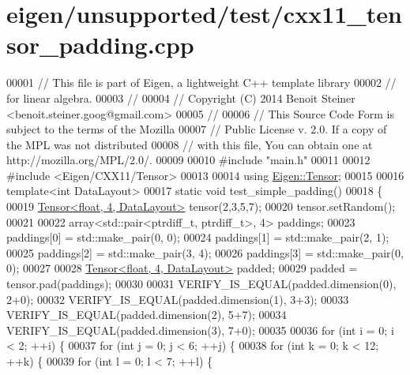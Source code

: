 \hypertarget{eigen_2unsupported_2test_2cxx11__tensor__padding_8cpp_source}{}\section{eigen/unsupported/test/cxx11\+\_\+tensor\+\_\+padding.cpp}
\label{eigen_2unsupported_2test_2cxx11__tensor__padding_8cpp_source}

\begin{DoxyCode}
00001 \textcolor{comment}{// This file is part of Eigen, a lightweight C++ template library}
00002 \textcolor{comment}{// for linear algebra.}
00003 \textcolor{comment}{//}
00004 \textcolor{comment}{// Copyright (C) 2014 Benoit Steiner <benoit.steiner.goog@gmail.com>}
00005 \textcolor{comment}{//}
00006 \textcolor{comment}{// This Source Code Form is subject to the terms of the Mozilla}
00007 \textcolor{comment}{// Public License v. 2.0. If a copy of the MPL was not distributed}
00008 \textcolor{comment}{// with this file, You can obtain one at http://mozilla.org/MPL/2.0/.}
00009 
00010 \textcolor{preprocessor}{#include "main.h"}
00011 
00012 \textcolor{preprocessor}{#include <Eigen/CXX11/Tensor>}
00013 
00014 \textcolor{keyword}{using} \hyperlink{class_eigen_1_1_tensor}{Eigen::Tensor};
00015 
00016 \textcolor{keyword}{template}<\textcolor{keywordtype}{int} DataLayout>
00017 \textcolor{keyword}{static} \textcolor{keywordtype}{void} test\_simple\_padding()
00018 \{
00019   \hyperlink{class_eigen_1_1_tensor}{Tensor<float, 4, DataLayout>} tensor(2,3,5,7);
00020   tensor.setRandom();
00021 
00022   array<std::pair<ptrdiff\_t, ptrdiff\_t>, 4> paddings;
00023   paddings[0] = std::make\_pair(0, 0);
00024   paddings[1] = std::make\_pair(2, 1);
00025   paddings[2] = std::make\_pair(3, 4);
00026   paddings[3] = std::make\_pair(0, 0);
00027 
00028   \hyperlink{class_eigen_1_1_tensor}{Tensor<float, 4, DataLayout>} padded;
00029   padded = tensor.pad(paddings);
00030 
00031   VERIFY\_IS\_EQUAL(padded.dimension(0), 2+0);
00032   VERIFY\_IS\_EQUAL(padded.dimension(1), 3+3);
00033   VERIFY\_IS\_EQUAL(padded.dimension(2), 5+7);
00034   VERIFY\_IS\_EQUAL(padded.dimension(3), 7+0);
00035 
00036   \textcolor{keywordflow}{for} (\textcolor{keywordtype}{int} i = 0; i < 2; ++i) \{
00037     \textcolor{keywordflow}{for} (\textcolor{keywordtype}{int} j = 0; j < 6; ++j) \{
00038       \textcolor{keywordflow}{for} (\textcolor{keywordtype}{int} k = 0; k < 12; ++k) \{
00039         \textcolor{keywordflow}{for} (\textcolor{keywordtype}{int} l = 0; l < 7; ++l) \{

\end{DoxyCode}

